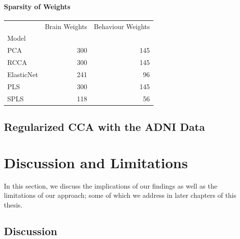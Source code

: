 \paragraph{Sparsity of Weights}

\begin{tabular}{lrr}
\toprule
{} &  Brain Weights &  Behaviour Weights \\
Model      &                &                    \\
\midrule
PCA        &            300 &                145 \\
RCCA       &            300 &                145 \\
ElasticNet &            241 &                 96 \\
PLS        &            300 &                145 \\
SPLS       &            118 &                 56 \\
\bottomrule
\end{tabular}

%

\subsection{Regularized CCA with the ADNI Data}


\section{Discussion and Limitations}

In this section, we discuss the implications of our findings as well as the limitations of our approach; some of which we address in later chapters of this thesis.

\subsection{Discussion}

